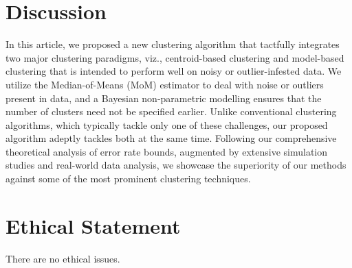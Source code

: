 \documentclass{article}
\begin{document}

\section{Discussion}

In this article, we proposed a new clustering algorithm that tactfully integrates two major clustering paradigms, viz., centroid-based clustering and model-based clustering that is intended to perform  well on noisy or outlier-infested data. We utilize the Median-of-Means (MoM) estimator to deal with noise or outliers present in data, and a Bayesian non-parametric modelling ensures that the number of clusters need not be specified earlier. Unlike conventional clustering algorithms, which typically tackle only one of these challenges, our proposed algorithm adeptly tackles both at the same time. Following our comprehensive theoretical analysis of error rate bounds, augmented by extensive simulation studies and real-world data analysis, we showcase the superiority of our methods against some of the most prominent clustering techniques.




\appendix

\section*{Ethical Statement}

There are no ethical issues.






\end{document}
